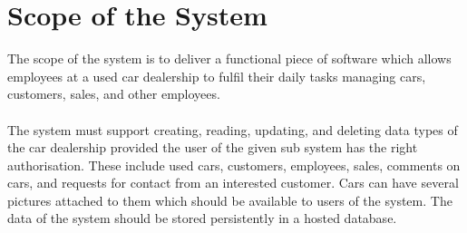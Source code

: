 \section{Scope of the System}
The scope of the system is to deliver a functional piece of software which allows employees at a used car dealership to fulfil their daily tasks managing cars, customers, sales, and other employees.\\\\
The system must support creating, reading, updating, and deleting data types of the car dealership provided the user of the given sub system has the right authorisation.
These include used cars, customers, employees, sales, comments on cars, and requests for contact from an interested customer. 
Cars can have several pictures attached to them which should be available to users of the system. 
The data of the system should be stored persistently in a hosted database. 